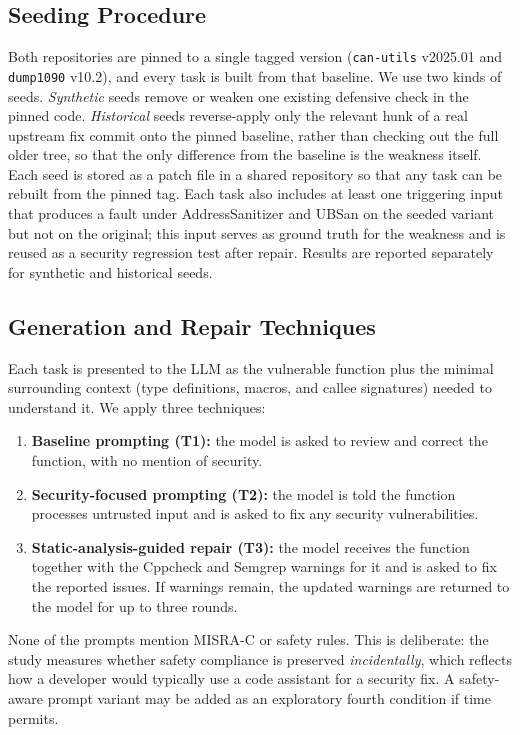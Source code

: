 \documentclass[12pt]{IEEEtran}
\begin{document}
\subsection{Seeding Procedure}
Both repositories are pinned to a single tagged version (\texttt{can-utils} v2025.01 and \texttt{dump1090} v10.2), and every task is built from that baseline. We use two kinds of seeds. \emph{Synthetic} seeds remove or weaken one existing defensive check in the pinned code. \emph{Historical} seeds reverse-apply only the relevant hunk of a real upstream fix commit onto the pinned baseline, rather than checking out the full older tree, so that the only difference from the baseline is the weakness itself. Each seed is stored as a patch file in a shared repository so that any task can be rebuilt from the pinned tag. Each task also includes at least one triggering input that produces a fault under AddressSanitizer and UBSan on the seeded variant but not on the original; this input serves as ground truth for the weakness and is reused as a security regression test after repair. Results are reported separately for synthetic and historical seeds.

\subsection{Generation and Repair Techniques}
Each task is presented to the LLM as the vulnerable function plus the minimal surrounding context (type definitions, macros, and callee signatures) needed to understand it. We apply three techniques:
\begin{enumerate}
    \item \textbf{Baseline prompting (T1):} the model is asked to review and correct the function, with no mention of security.
    \item \textbf{Security-focused prompting (T2):} the model is told the function processes untrusted input and is asked to fix any security vulnerabilities.
    \item \textbf{Static-analysis-guided repair (T3):} the model receives the function together with the Cppcheck and Semgrep warnings for it and is asked to fix the reported issues. If warnings remain, the updated warnings are returned to the model for up to three rounds.
\end{enumerate}
None of the prompts mention MISRA-C or safety rules. This is deliberate: the study measures whether safety compliance is preserved \emph{incidentally}, which reflects how a developer would typically use a code assistant for a security fix. A safety-aware prompt variant may be added as an exploratory fourth condition if time permits.
\end{document}

